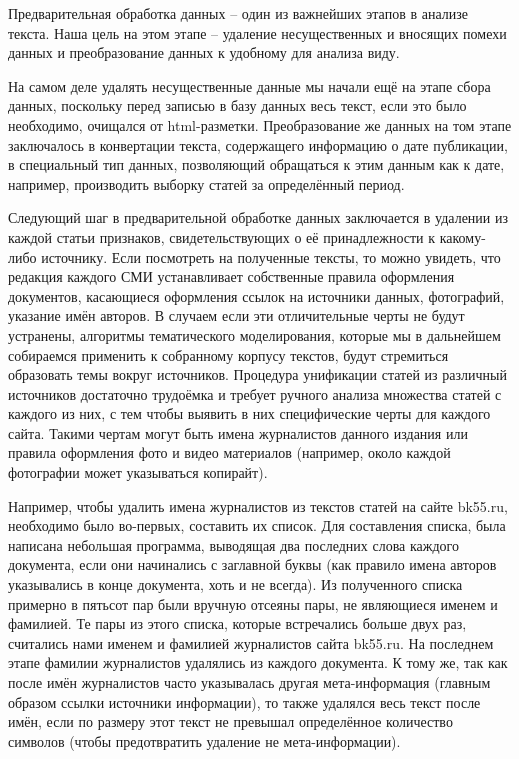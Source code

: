 Предварительная обработка данных -- один из важнейших этапов в анализе текста. Наша цель на этом этапе -- удаление несущественных и вносящих помехи данных и преобразование данных к удобному для анализа виду.

На самом деле удалять несущественные данные мы начали ещё на этапе сбора данных, поскольку перед записью в базу данных весь текст, если это было необходимо, очищался от html-разметки. Преобразование же данных на том этапе заключалось в конвертации текста, содержащего информацию о дате публикации, в специальный тип данных, позволяющий обращаться к этим данным как к дате, например, производить выборку статей за определённый период.

Следующий шаг в предварительной обработке данных заключается в удалении из каждой статьи признаков, свидетельствующих о её принадлежности к какому-либо источнику. Если посмотреть на полученные тексты, то можно увидеть, что редакция каждого СМИ устанавливает собственные правила оформления документов, касающиеся оформления ссылок на источники данных, фотографий, указание имён авторов. В случаем если эти отличительные черты не будут устранены, алгоритмы тематического моделирования, которые мы в дальнейшем собираемся применить к собранному корпусу текстов, будут стремиться образовать темы вокруг источников. Процедура унификации статей из различный источников достаточно трудоёмка и требует ручного анализа множества статей с каждого из них, с тем чтобы выявить в них специфические черты для каждого сайта. Такими чертам могут быть имена журналистов данного издания или правила оформления фото и видео материалов (например, около каждой фотографии может указываться копирайт).

Например, чтобы удалить имена журналистов из текстов статей на сайте bk55.ru, необходимо было во-первых, составить их список. Для составления списка, была написана небольшая программа, выводящая два последних слова каждого документа, если они начинались с заглавной буквы (как правило имена авторов указывались в конце документа, хоть и не всегда). Из полученного списка примерно в пятьсот пар были вручную отсеяны пары, не являющиеся именем и фамилией. Те пары из этого списка, которые встречались больше двух раз, считались нами именем и фамилией журналистов сайта bk55.ru. На последнем этапе фамилии журналистов удалялись из каждого документа. К тому же, так как после имён журналистов часто указывалась другая мета-информация (главным образом ссылки источники информации), то также удалялся весь текст после имён, если по размеру этот текст не превышал определённое количество символов (чтобы предотвратить удаление не мета-информации). 

